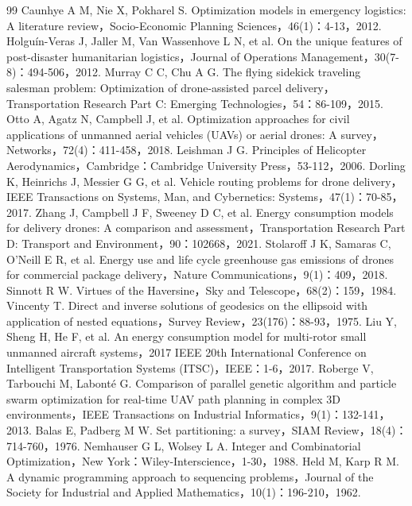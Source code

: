 \documentclass[withoutpreface,bwprint]{format}
\begin{document}
\clearpage
\begin{thebibliography}{99}
 Caunhye A M, Nie X, Pokharel S. Optimization models in emergency logistics: A literature review，Socio-Economic Planning Sciences，46(1)：4-13，2012.
 Holguín-Veras J, Jaller M, Van Wassenhove L N, et al. On the unique features of post-disaster humanitarian logistics，Journal of Operations Management，30(7-8)：494-506，2012.
 Murray C C, Chu A G. The flying sidekick traveling salesman problem: Optimization of drone-assisted parcel delivery，Transportation Research Part C: Emerging Technologies，54：86-109，2015.
 Otto A, Agatz N, Campbell J, et al. Optimization approaches for civil applications of unmanned aerial vehicles (UAVs) or aerial drones: A survey，Networks，72(4)：411-458，2018.
 Leishman J G. Principles of Helicopter Aerodynamics，Cambridge：Cambridge University Press，53-112，2006.
 Dorling K, Heinrichs J, Messier G G, et al. Vehicle routing problems for drone delivery，IEEE Transactions on Systems, Man, and Cybernetics: Systems，47(1)：70-85，2017.
 Zhang J, Campbell J F, Sweeney D C, et al. Energy consumption models for delivery drones: A comparison and assessment，Transportation Research Part D: Transport and Environment，90：102668，2021.
 Stolaroff J K, Samaras C, O'Neill E R, et al. Energy use and life cycle greenhouse gas emissions of drones for commercial package delivery，Nature Communications，9(1)：409，2018.
 Sinnott R W. Virtues of the Haversine，Sky and Telescope，68(2)：159，1984.
 Vincenty T. Direct and inverse solutions of geodesics on the ellipsoid with application of nested equations，Survey Review，23(176)：88-93，1975.
 Liu Y, Sheng H, He F, et al. An energy consumption model for multi-rotor small unmanned aircraft systems，2017 IEEE 20th International Conference on Intelligent Transportation Systems (ITSC)，IEEE：1-6，2017.
 Roberge V, Tarbouchi M, Labonté G. Comparison of parallel genetic algorithm and particle swarm optimization for real-time UAV path planning in complex 3D environments，IEEE Transactions on Industrial Informatics，9(1)：132-141，2013.
 Balas E, Padberg M W. Set partitioning: a survey，SIAM Review，18(4)：714-760，1976.
 Nemhauser G L, Wolsey L A. Integer and Combinatorial Optimization，New York：Wiley-Interscience，1-30，1988.
 Held M, Karp R M. A dynamic programming approach to sequencing problems，Journal of the Society for Industrial and Applied Mathematics，10(1)：196-210，1962.

\end{thebibliography}
\end{document}
